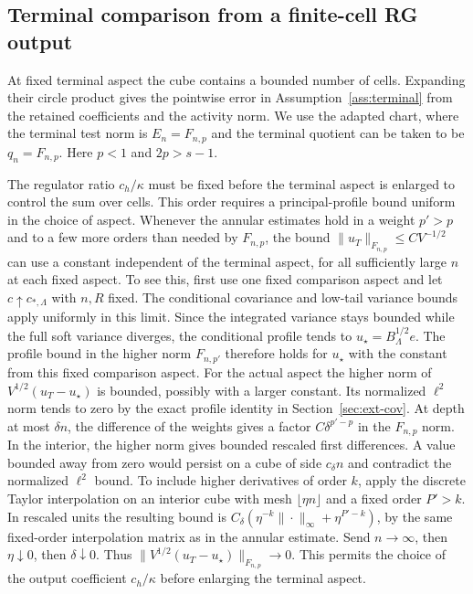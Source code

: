 \documentclass[11pt]{article}
\theoremstyle{definition}
\begin{document}
\subsection{Terminal comparison from a finite-cell RG output}
\label{sec:terminal-output}

At fixed terminal aspect the cube contains a bounded number of
cells. Expanding their circle product gives the pointwise error
in Assumption~\ref{ass:terminal} from the retained coefficients
and the activity norm. We use the adapted chart,
where the terminal test norm is \(E_n=F_{n,p}\) and the terminal
quotient can be taken to be \(q_n=F_{n,p}\). Here \(p<1\) and
\(2p>s-1\).

The regulator ratio \(c_h/\kappa\) must be fixed before the terminal
aspect is enlarged to control the sum over cells. This order requires
a principal-profile bound uniform in the choice of aspect. Whenever
the annular estimates hold in a weight \(p'>p\) and to a few more
orders than needed by \(F_{n,p}\), the bound
\(\|u_T\|_{F_{n,p}}\le C V^{-1/2}\) can use a constant independent
of the terminal aspect, for all sufficiently large \(n\) at each
fixed aspect. To see this, first use one fixed comparison aspect
and let \(c\uparrow c_{*,\Lambda}\) with \(n,R\) fixed. The
conditional covariance and low-tail variance bounds apply
uniformly in this limit. Since the integrated variance stays
bounded while the full soft variance diverges, the conditional
profile tends to \(u_\star=B_\Lambda^{1/2}e\). The profile bound
in the higher norm \(F_{n,p'}\) therefore holds for \(u_\star\)
with the constant from this fixed comparison aspect. For the
actual aspect the higher norm of \(V^{1/2}(u_T-u_\star)\) is
bounded, possibly with a larger constant. Its normalized
\(\ell^2\) norm tends to zero by the exact profile identity in
Section~\ref{sec:ext-cov}. At depth at most \(\delta n\), the
difference of the weights gives a factor \(C\delta^{p'-p}\)
in the \(F_{n,p}\) norm. In the interior, the higher norm
gives bounded rescaled first differences. A value bounded
away from zero would persist on a cube of side \(c_\delta n\)
and contradict the normalized \(\ell^2\) bound. To include
higher derivatives of order \(k\), apply the discrete Taylor
interpolation on an interior cube with mesh \(\lfloor\eta n\rfloor\)
and a fixed order \(P'>k\). In rescaled units the resulting
bound is \(C_{\delta}(\eta^{-k}\|\cdot\|_\infty+
\eta^{P'-k})\), by the same fixed-order interpolation matrix
as in the annular estimate. Send \(n\to\infty\), then
\(\eta\downarrow0\), then \(\delta\downarrow0\). Thus
\(\|V^{1/2}(u_T-u_\star)\|_{F_{n,p}}\to0\).
This permits the choice of the output coefficient \(c_h/\kappa\)
before enlarging the terminal aspect.
\end{document}
